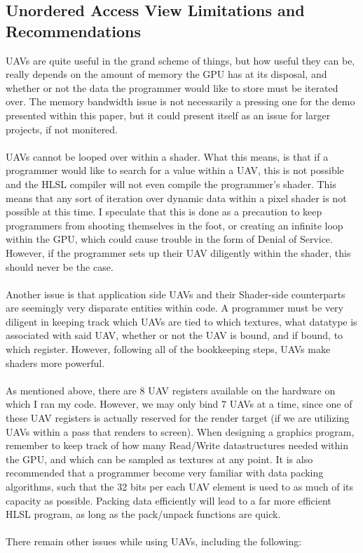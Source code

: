 \documentclass[a4paper, 12pt]{article}
\begin{document}
\subsection{Unordered Access View Limitations and Recommendations}

\label{section:UAVLimits}

UAVs are quite useful in the grand scheme of things, but how useful they can
be, really depends on the amount of memory the GPU has at its disposal, and
whether or not the data the programmer would like to store must be iterated
over. The memory bandwidth issue is not necessarily a pressing one for the
demo presented within this paper, but it could present itself as an issue for
larger projects, if not monitered. \\ \\ UAVs cannot be looped over within a
shader. What this means, is that if a programmer would like to search for a
value within a UAV, this is not possible and the HLSL compiler will not even
compile the programmer's shader. This means that any sort of iteration over
dynamic data within a pixel shader is not possible at this time. I speculate
that this is done as a precaution to keep programmers from shooting themselves
in the foot, or creating an infinite loop within the GPU, which could cause
trouble in the form of Denial of Service. However, if the programmer sets up
their UAV diligently within the shader, this should never be the case. \\ \\
Another issue is that application side UAVs and their Shader-side counterparts
are seemingly very disparate entities within code. A programmer must be very
diligent in keeping track which UAVs are tied to which textures, what datatype
is associated with said UAV, whether or not the UAV is bound, and if bound, to
which register. However, following all of the bookkeeping steps, UAVs make
shaders more powerful. \\ \\ As mentioned above, there are 8 UAV registers
available on the hardware on which I ran my code. However, we may only bind 7
UAVs at a time, since one of these UAV registers is actually reserved for the
render target (if we are utilizing UAVs within a pass that renders to screen).
When designing a graphics program, remember to keep track of how many
Read/Write datastructures needed within the GPU, and which can be sampled as
textures at any point. It is also recommended that a programmer become very
familiar with data packing algorithms, such that the 32 bits per each UAV
element is used to as much of its capacity as possible. Packing data
efficiently will lead to a far more efficient HLSL program, as long as the
pack/unpack functions are quick. \\ \\ There remain other issues while using
UAVs, including the following:
\end{document}
